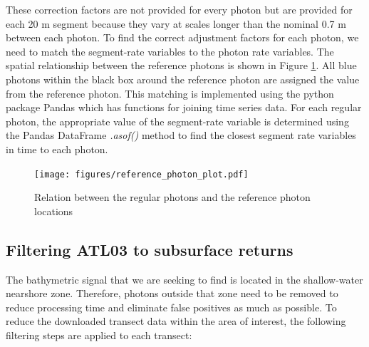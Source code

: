 These correction factors are not provided for every photon but are provided for each 20 m segment because they vary at scales longer than the nominal 0.7 m between each photon. To find the correct adjustment factors for each photon, we need to match the segment-rate variables to the photon rate variables. The spatial relationship between the reference photons is shown in Figure \ref{fig:reference-photon_match}. All blue photons within the black box around the reference photon are assigned the value from the reference photon. This matching is implemented using the python package Pandas \parencite{jeff_reback_2022_6408044,mckinney-proc-scipy-2010} which has functions for joining time series data. For each regular photon, the appropriate value of the segment-rate variable is determined using the Pandas DataFrame \emph{.asof()} method to find the closest segment rate variables in time to each photon. 

\begin{figure}[h]
    \centering
    \texttt{[image: figures/reference\_photon\_plot.pdf]}
    \caption{Relation between the regular photons and the reference photon locations}
    \label{fig:reference-photon_match} 
\end{figure}

\subsection{Filtering ATL03 to subsurface returns}\label{subsec:subsurface-filtering}

The bathymetric signal that we are seeking to find is located in the shallow-water nearshore zone. Therefore, photons outside that zone need to be removed to reduce processing time and eliminate false positives as much as possible. To reduce the downloaded transect data within the area of interest, the following filtering steps are applied to each transect:


